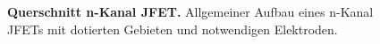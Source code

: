{%

\begin{figure}[H]
    \centering
    
    \caption{\textbf{Querschnitt n-Kanal JFET.} Allgemeiner Aufbau eines n-Kanal JFETs mit dotierten Gebieten und 
    notwendigen Elektroden.}  
    \label{fig:QuerschnittN-KanalJFET}
\end{figure}}




